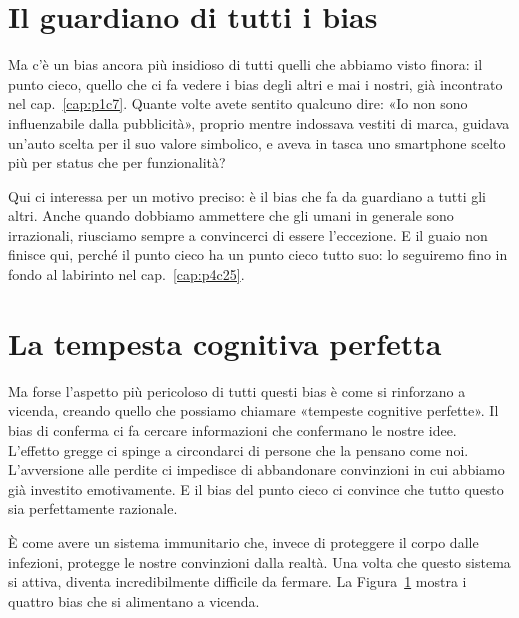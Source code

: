 \section{Il guardiano di tutti i bias}
\label{sec:p4c8-il-guardiano-di}
Ma c'è un bias ancora più insidioso di tutti quelli che abbiamo visto finora: il punto cieco, quello che ci fa vedere i bias degli altri e mai i nostri, già incontrato nel cap.~\ref{cap:p1c7}. Quante volte avete sentito qualcuno dire: «Io non sono influenzabile dalla pubblicità», proprio mentre indossava vestiti di marca, guidava un'auto scelta per il suo valore simbolico, e aveva in tasca uno smartphone scelto più per status che per funzionalità?

Qui ci interessa per un motivo preciso: è il bias che fa da guardiano a tutti gli altri. Anche quando dobbiamo ammettere che gli umani in generale sono irrazionali, riusciamo sempre a convincerci di essere l'eccezione. E il guaio non finisce qui, perché il punto cieco ha un punto cieco tutto suo: lo seguiremo fino in fondo al labirinto nel cap.~\ref{cap:p4c25}.

\medskip

\section{La tempesta cognitiva perfetta}
\label{sec:p4c8-la-tempesta-cognitiva}
Ma forse l'aspetto più pericoloso di tutti questi bias è come si rinforzano a vicenda, creando quello che possiamo chiamare «tempeste cognitive perfette». Il bias di conferma ci fa cercare informazioni che confermano le nostre idee. L'effetto gregge ci spinge a circondarci di persone che la pensano come noi. L'avversione alle perdite ci impedisce di abbandonare convinzioni in cui abbiamo già investito emotivamente. E il bias del punto cieco ci convince che tutto questo sia perfettamente razionale.

È come avere un sistema immunitario che, invece di proteggere il corpo dalle infezioni, protegge le nostre convinzioni dalla realtà. Una volta che questo sistema si attiva, diventa incredibilmente difficile da fermare. La Figura~\ref{fig:tempesta_cognitiva} mostra i quattro bias che si alimentano a vicenda.

\begin{figure}[htbp]
	\centering
	\label{fig:tempesta_cognitiva}
\end{figure}

